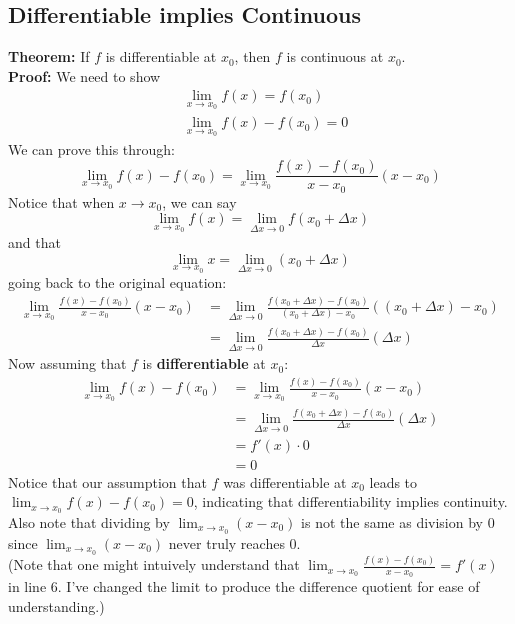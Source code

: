 \documentclass{report}
\begin{document}
\subsection{Differentiable implies Continuous} %
\textbf{Theorem:} If $f$ is differentiable at $x_0$, then $f$ is continuous at $x_0$.\\
\textbf{Proof:} We need to show
\begin{align*}
&\lim_{x\to x_0}f(x)=f(x_0)\\
&\lim_{x\to x_0}f(x)-f(x_0)=0
\end{align*}
We can prove this through:
\begin{equation*}
\lim_{x\to x_0}f(x)-f(x_0)=\lim_{x\to x_0}\frac{f(x)-f(x_0)}{x-x_0}(x-x_0)
\end{equation*}
Notice that when $x\to x_0$, we can say
\begin{equation*}
\lim_{x\to x_0}f(x)=\lim_{\Delta x\to 0}f(x_0+\Delta x)
\end{equation*}
and that 
\begin{equation*}
\lim_{x\to x_0}x=\lim_{\Delta x\to 0}(x_0+\Delta x)
\end{equation*}
going back to the original equation:
\begin{align*}
\lim_{x\to x_0}\frac{f(x)-f(x_0)}{x-x_0}(x-x_0)
&=\lim_{\Delta x\to 0}\frac{f(x_0+\Delta x)-f(x_0)}{(x_0+\Delta x)-x_0}((x_0+\Delta x)-x_0)\\
&=\lim_{\Delta x\to 0}\frac{f(x_0+\Delta x)-f(x_0)}{\Delta x}(\Delta x)
\end{align*}
Now assuming that $f$ is \textbf{differentiable} at $x_0$:
\begin{align*}
\lim_{x\to x_0}f(x)-f(x_0)&=\lim_{x\to x_0}\frac{f(x)-f(x_0)}{x-x_0}(x-x_0)\\
&=\lim_{\Delta x\to 0}\frac{f(x_0+\Delta x)-f(x_0)}{\Delta x}(\Delta x)\\
&=f'(x)\cdot 0\\
&=0
\end{align*}
Notice that our assumption that $f$ was differentiable at $x_0$ leads to\\ 
$\lim_{x\to x_0}f(x)-f(x_0)=0$, indicating that differentiability implies continuity.\\
Also note that dividing by $\lim_{x\to x_0}(x-x_0)$ is not the same as division by 0 since 
$\lim_{x\to x_0}(x-x_0)$ never truly reaches 0.
\vspace{2mm}\\
(Note that one might intuively understand that $\lim_{x\to x_0}\frac{f(x)-f(x_0)}{x-x_0}=f'(x)$
in line 6. I've changed the limit to produce the difference quotient for ease of understanding.)
\newpage
\end{document}
